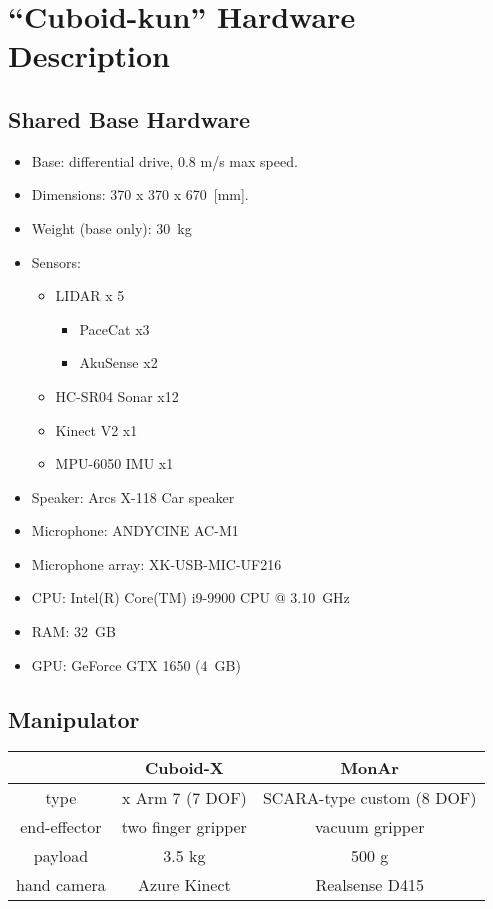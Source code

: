 \section*{``Cuboid-kun'' Hardware Description}
\label{sec:annex-OPL}

\subsection*{Shared Base Hardware}
\begin{itemize}
    \item Base: differential drive, 0.8 m/s max speed.
    \item Dimensions: 370 x 370 x 670~[mm].
    \item Weight (base only): 30~kg
    \item Sensors:
          \begin{itemize}
              \item LIDAR x 5
                    \begin{itemize}
                        \item PaceCat x3
                        \item AkuSense x2
                    \end{itemize}
              \item HC-SR04 Sonar x12
              \item Kinect V2 x1
              \item MPU-6050 IMU x1
          \end{itemize}
    \item Speaker: Arcs X-118 Car speaker
    \item Microphone: ANDYCINE AC-M1
    \item Microphone array: XK-USB-MIC-UF216
    \item CPU: Intel(R) Core(TM) i9-9900 CPU @ 3.10~GHz
    \item RAM: 32~GB
    \item GPU: GeForce GTX 1650 (4~GB)
\end{itemize}

\subsection*{Manipulator}

\begin{table}[h]
    \centering
    \begin{tabular}{c|c|c}
                     & Cuboid-X           & MonAr                     \\ \hline
        type         & x Arm 7 (7 DOF)    & SCARA-type custom (8 DOF) \\
        end-effector & two finger gripper & vacuum gripper            \\
        payload      & 3.5 kg             & 500 g                     \\
        hand camera  & Azure Kinect       & Realsense D415            \\
    \end{tabular}
\end{table}

